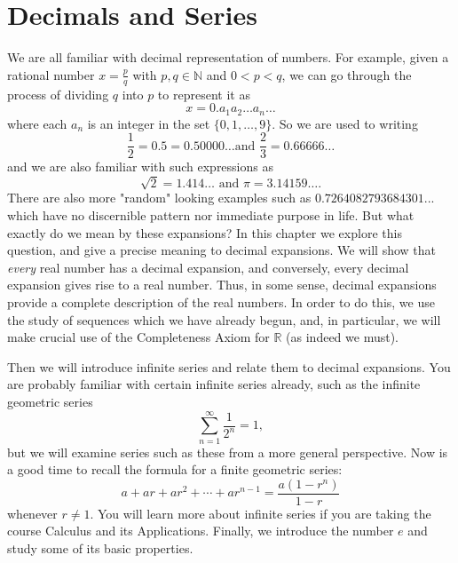 \documentclass[11pt,dvipsnames]{book}
\numberwithin{figure}{section} %
\numberwithin{table}{section} %
\begin{document}
\chapter{Decimals and Series}
We are all familiar with decimal representation of numbers. For example, given a rational number $x = \frac{p}{q}$ with $p, q \in \mathbb{N}$ and $0 < p < q$, we can go through the process of dividing $q$ into $p$ to represent it as
\[ x = 0.a_1 a_2 \dots a_n \dots\]
where each $a_n$ is an integer in the set $\{0,1,\dots, 9\}$. So we are used to writing \[ \frac{1}{2} = 0.5 = 0.50000\dots \mbox{
and } \frac{2}{3} = 0.66666\dots\]
and we are also familiar with such expressions as
\[ \sqrt{2} = 1.414\dots \mbox{ and } \pi = 3.14159 \dots. \]
There are also more "random" looking examples such as $0.7264082793684301...$ which have no discernible pattern nor immediate purpose in life. But what exactly do we mean by these expansions? In this chapter we explore this question, and give a precise meaning to decimal expansions. We will show that {\em every} real number has a decimal expansion, and conversely, every decimal expansion gives rise to a real number. Thus, in some sense, decimal expansions provide a complete description of the real numbers. In order to do this, we use the study of sequences which we have already begun, and, in particular, we will make crucial use of the Completeness Axiom for $\mathbb{R}$ (as indeed we must).

Then we will introduce infinite series and relate them to decimal expansions. You are probably familiar with certain infinite series already, such as the infinite geometric series
\[ \sum_{n=1}^\infty \frac{1}{2^n} = 1,\]
but we will examine series such as these from a more general perspective. Now is a good time to recall the formula for a finite geometric series:
\[ a + ar + ar^2 + \cdots + ar^{n-1} = \frac{a(1-r^{n})}{1-r}\]
whenever $r \neq 1$. You will learn more about infinite series if you are taking the course Calculus and its Applications. Finally, we introduce the number $e$ and study some of its basic properties.
\end{document}
